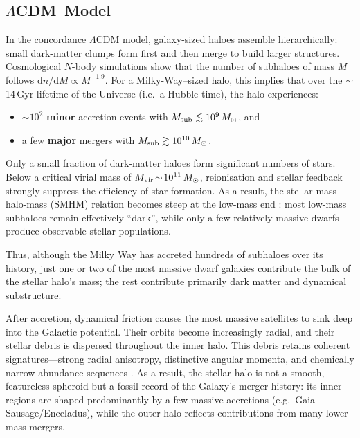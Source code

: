 \documentclass[a4paper,12pt]{article}
\begin{document}
\subsection{$\Lambda$CDM\, Model}
\label{subsec:LCDM_halo}

In the concordance $\Lambda$CDM model, galaxy-sized haloes assemble hierarchically:  
small dark-matter clumps form first and then merge to build larger structures.  
Cosmological $N$-body simulations show that the number of subhaloes of mass $M$ follows  
$\mathrm{d}n/\mathrm{d}M \propto M^{-1.9}$.  
For a Milky-Way–sized halo, this implies that over the $\sim$14\,Gyr lifetime of the Universe
(i.e.\ a Hubble time), the halo experiences:
\begin{itemize}
    \item ${\sim}10^{2}$ \textbf{minor} accretion events with $M_{\rm sub}\lesssim10^{9}\,M_\odot$, and 
    \item a few \textbf{major} mergers with $M_{\rm sub}\gtrsim10^{10}\,M_\odot$.
\end{itemize}
  

Only a small fraction of dark-matter haloes form significant numbers of stars.  
Below a critical virial mass of $M_{\rm vir}\!\sim\!10^{11}\,M_\odot$, reionisation and stellar feedback 
strongly suppress the efficiency of star formation.  
As a result, the stellar-mass–halo-mass (SMHM) relation becomes steep at the low-mass end 
\citep{Purcell2007,BullockBoylanKolchin2017}:  
most low-mass subhaloes remain effectively ``dark'', while only a few relatively massive dwarfs 
produce observable stellar populations.

Thus, although the Milky Way has accreted hundreds of subhaloes over its history,  
just one or two of the most massive dwarf galaxies contribute the bulk of the stellar halo’s mass;  
the rest contribute primarily dark matter and dynamical substructure.

After accretion, dynamical friction causes the most massive satellites to sink deep into the Galactic potential.  
Their orbits become increasingly radial, and their stellar debris is dispersed throughout the inner halo.  
This debris retains coherent signatures—strong radial anisotropy, distinctive angular momenta,  
and chemically narrow abundance sequences \citep[e.g.][]{HelmiDeZeeuw2000}.  
As a result, the stellar halo is not a smooth, featureless spheroid but a fossil record of the Galaxy’s 
merger history: its inner regions are shaped predominantly by a few massive accretions 
(e.g.\ Gaia-Sausage/Enceladus), while the outer halo reflects contributions from many lower-mass mergers.
\end{document}
